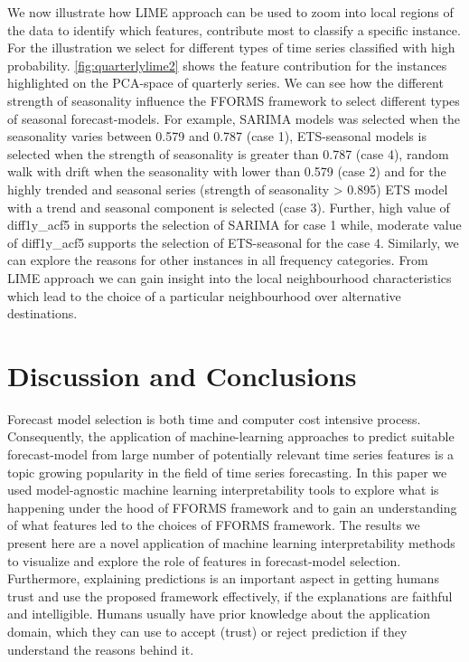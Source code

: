 \documentclass[11pt,a4paper,]{article}
\begin{document}
We now illustrate how LIME approach can be used to zoom into local
regions of the data to identify which features, contribute most to
classify a specific instance. For the illustration we select for
different types of time series classified with high probability.
\autoref{fig:quarterlylime2} shows the feature contribution for the
instances highlighted on the PCA-space of quarterly series. We can see
how the different strength of seasonality influence the FFORMS framework
to select different types of seasonal forecast-models. For example,
SARIMA models was selected when the seasonality varies between 0.579 and
0.787 (case 1), ETS-seasonal models is selected when the strength of
seasonality is greater than 0.787 (case 4), random walk with drift when
the seasonality with lower than 0.579 (case 2) and for the highly
trended and seasonal series (strength of seasonality \textgreater{}
0.895) ETS model with a trend and seasonal component is selected (case
3). Further, high value of diff1y\_acf5 in supports the selection of
SARIMA for case 1 while, moderate value of diff1y\_acf5 supports the
selection of ETS-seasonal for the case 4. Similarly, we can explore the
reasons for other instances in all frequency categories. From LIME
approach we can gain insight into the local neighbourhood
characteristics which lead to the choice of a particular neighbourhood
over alternative destinations.

\section{Discussion and Conclusions}\label{conclusions}

Forecast model selection is both time and computer cost intensive
process. Consequently, the application of machine-learning approaches to
predict suitable forecast-model from large number of potentially
relevant time series features is a topic growing popularity in the field
of time series forecasting. In this paper we used model-agnostic machine
learning interpretability tools to explore what is happening under the
hood of FFORMS framework and to gain an understanding of what features
led to the choices of FFORMS framework. The results we present here are
a novel application of machine learning interpretability methods to
visualize and explore the role of features in forecast-model selection.
Furthermore, explaining predictions is an important aspect in getting
humans trust and use the proposed framework effectively, if the
explanations are faithful and intelligible. Humans usually have prior
knowledge about the application domain, which they can use to accept
(trust) or reject prediction if they understand the reasons behind it.
\end{document}
